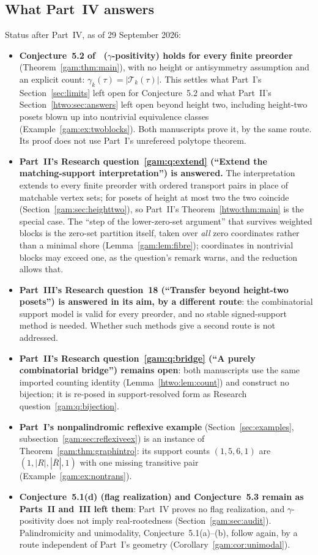 \documentclass[11pt]{article}
\numberwithin{equation}{section}
\theoremstyle{definition}
\newcommand{\Tset}{\mathcal T}
\begin{document}
\subsection{What Part~IV answers}
\label{gam:sec:answers}
Status after Part~IV, as of 29 September 2026:
\begin{itemize}[leftmargin=1.4em]
\item \textbf{Conjecture~5.2 of~\cite{AC} ($\gamma$-positivity) holds for
every finite preorder} (Theorem~\ref{gam:thm:main}), with no height or
antisymmetry assumption and an explicit count:
$\gamma_k(\tau)=|\Tset_k(\tau)|$. This settles what Part~I's
Section~\ref{sec:limits} left open for Conjecture~5.2 and what Part~II's
Section~\ref{htwo:sec:answers} left open beyond height two, including
height-two posets blown up into nontrivial equivalence classes
(Example~\ref{gam:ex:twoblocks}). Both manuscripts prove it, by the same
route. Its proof does not use Part~I's unrefereed polytope theorem.
\item \textbf{Part~II's Research question~\ref{gam:q:extend} (``Extend the
matching-support interpretation'') is answered.} The interpretation extends
to every finite preorder with ordered transport pairs in place of
matchable vertex sets; for posets of height at most two the two coincide
(Section~\ref{gam:sec:heighttwo}), so Part~II's Theorem~\ref{htwo:thm:main}
is the special case. The ``step of the lower-zero-set argument'' that
survives weighted blocks is the zero-set partition itself, taken over
\emph{all} zero coordinates rather than a minimal shore
(Lemma~\ref{gam:lem:fibre}); coordinates in nontrivial blocks may exceed
one, as the question's remark warns, and the reduction allows that.
\item \textbf{Part~III's Research question~18 (``Transfer beyond height-two
posets'') is answered in its aim, by a different route}: the combinatorial
support model is valid for every preorder, and no stable signed-support
method is needed. Whether such methods give a second route is not
addressed.
\item \textbf{Part~II's Research question~\ref{gam:q:bridge} (``A purely
combinatorial bridge'') remains open}: both manuscripts use the same
imported counting identity (Lemma~\ref{htwo:lem:count}) and construct no
bijection; it is re-posed in support-resolved form as Research
question~\ref{gam:q:bijection}.
\item \textbf{Part~I's nonpalindromic reflexive example} (Section~\ref{sec:examples},
subsection~\ref{gam:sec:reflexiveex}) is an instance of
Theorem~\ref{gam:thm:graphintro}: its support counts $(1,5,6,1)$ are
$(1,|R|,|\overline R|,1)$ with one missing transitive pair
(Example~\ref{gam:ex:nontrans}).
\item \textbf{Conjecture~5.1(d) (flag realization) and Conjecture~5.3 remain
as Parts~II and~III left them}: Part~IV proves no flag realization, and
$\gamma$-positivity does not imply real-rootedness (Section~\ref{gam:sec:audit}).
Palindromicity and unimodality, Conjecture~5.1(a)--(b), follow again, by a
route independent of Part~I's geometry (Corollary~\ref{gam:cor:unimodal}).
\end{itemize}
\end{document}
